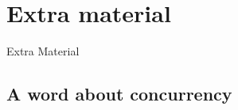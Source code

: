 \documentclass[aspectratio=169]{beamer}
\newcommand{\slidefont}{\scriptsize}
\begin{document}

\section{Extra material}


\begin{frame}[fragile]

  \slidefont

  \vfill

  \begin{center}\LARGE
    Extra Material
  \end{center}

  \vfill

\end{frame}


\subsection{A word about concurrency}

\end{document}
